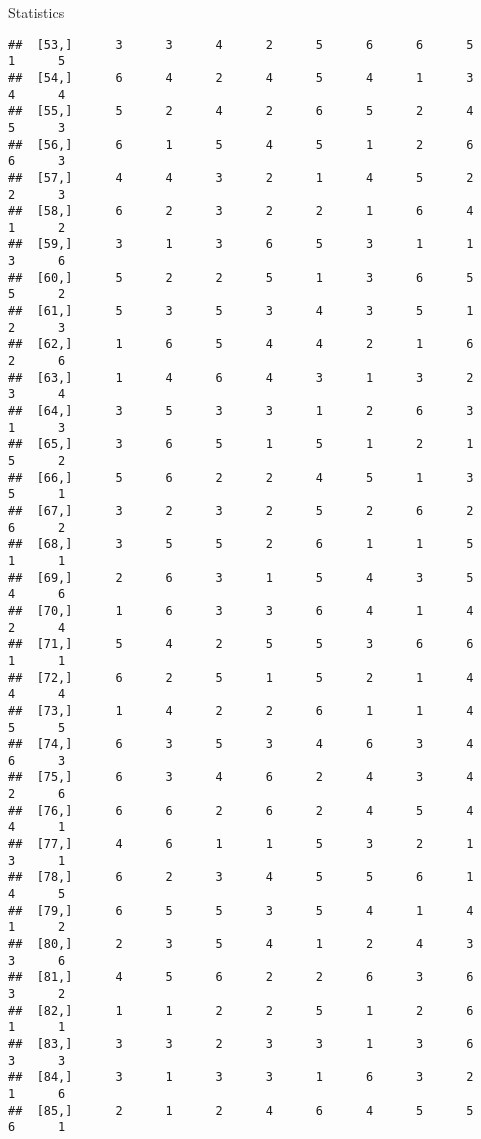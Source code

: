 \documentclass[
  ignorenonframetext,
]{beamer}
\begin{document}
\begin{frame}[fragile]{Statistics}
\begin{verbatim}
##  [53,]      3      3      4      2      5      6      6      5      1      5
##  [54,]      6      4      2      4      5      4      1      3      4      4
##  [55,]      5      2      4      2      6      5      2      4      5      3
##  [56,]      6      1      5      4      5      1      2      6      6      3
##  [57,]      4      4      3      2      1      4      5      2      2      3
##  [58,]      6      2      3      2      2      1      6      4      1      2
##  [59,]      3      1      3      6      5      3      1      1      3      6
##  [60,]      5      2      2      5      1      3      6      5      5      2
##  [61,]      5      3      5      3      4      3      5      1      2      3
##  [62,]      1      6      5      4      4      2      1      6      2      6
##  [63,]      1      4      6      4      3      1      3      2      3      4
##  [64,]      3      5      3      3      1      2      6      3      1      3
##  [65,]      3      6      5      1      5      1      2      1      5      2
##  [66,]      5      6      2      2      4      5      1      3      5      1
##  [67,]      3      2      3      2      5      2      6      2      6      2
##  [68,]      3      5      5      2      6      1      1      5      1      1
##  [69,]      2      6      3      1      5      4      3      5      4      6
##  [70,]      1      6      3      3      6      4      1      4      2      4
##  [71,]      5      4      2      5      5      3      6      6      1      1
##  [72,]      6      2      5      1      5      2      1      4      4      4
##  [73,]      1      4      2      2      6      1      1      4      5      5
##  [74,]      6      3      5      3      4      6      3      4      6      3
##  [75,]      6      3      4      6      2      4      3      4      2      6
##  [76,]      6      6      2      6      2      4      5      4      4      1
##  [77,]      4      6      1      1      5      3      2      1      3      1
##  [78,]      6      2      3      4      5      5      6      1      4      5
##  [79,]      6      5      5      3      5      4      1      4      1      2
##  [80,]      2      3      5      4      1      2      4      3      3      6
##  [81,]      4      5      6      2      2      6      3      6      3      2
##  [82,]      1      1      2      2      5      1      2      6      1      1
##  [83,]      3      3      2      3      3      1      3      6      3      3
##  [84,]      3      1      3      3      1      6      3      2      1      6
##  [85,]      2      1      2      4      6      4      5      5      6      1

\end{verbatim}
\end{frame}
\end{document}
